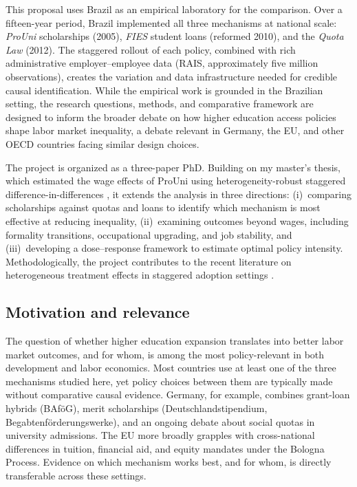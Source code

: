 \documentclass[a4paper,11pt]{article}
\begin{document}
This proposal uses Brazil as an empirical laboratory for the comparison. Over a fifteen-year period, Brazil implemented all three mechanisms at national scale: \textit{ProUni} scholarships (2005), \textit{FIES} student loans (reformed 2010), and the \textit{Quota Law} (2012). The staggered rollout of each policy, combined with rich administrative employer--employee data (RAIS, approximately five million observations), creates the variation and data infrastructure needed for credible causal identification. While the empirical work is grounded in the Brazilian setting, the research questions, methods, and comparative framework are designed to inform the broader debate on how higher education access policies shape labor market inequality, a debate relevant in Germany, the EU, and other OECD countries facing similar design choices.

The project is organized as a three-paper PhD. Building on my master's thesis, which estimated the wage effects of ProUni using heterogeneity-robust staggered difference-in-differences \citep{callaway2021}, it extends the analysis in three directions: (i)~comparing scholarships against quotas and loans to identify which mechanism is most effective at reducing inequality, (ii)~examining outcomes beyond wages, including formality transitions, occupational upgrading, and job stability, and (iii)~developing a dose--response framework to estimate optimal policy intensity. Methodologically, the project contributes to the recent literature on heterogeneous treatment effects in staggered adoption settings \citep{roth2023, dechaisemartin2020, goodmanbacon2021}.

\subsection{Motivation and relevance}

The question of whether higher education expansion translates into better labor market outcomes, and for whom, is among the most policy-relevant in both development and labor economics. Most countries use at least one of the three mechanisms studied here, yet policy choices between them are typically made without comparative causal evidence. Germany, for example, combines grant-loan hybrids (BAf\"oG), merit scholarships (Deutschlandstipendium, Begabtenf\"orderungswerke), and an ongoing debate about social quotas in university admissions. The EU more broadly grapples with cross-national differences in tuition, financial aid, and equity mandates under the Bologna Process. Evidence on which mechanism works best, and for whom, is directly transferable across these settings.
\end{document}
